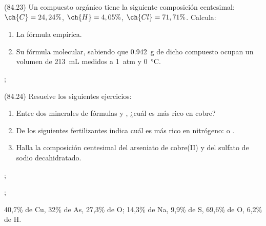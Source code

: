   \begin{exercise}[
      tags    = {},
      topics  = {química,química básica},
      source  = {FQ 1B MGH 2016, p84, e23},
    ]
    (84.23) Un compuesto orgánico tiene la siguiente composición centesimal: \( \ch{C} = 24,24\% \), \( \ch{H} = 4,05\% \), \( \ch{Cl} = 71,71\% \). Calcula: %
    \begin{enumerate}
      \item La fórmula empírica.
      \item Su fórmula molecular, sabiendo que \SI{0.942}{\gram} de dicho compuesto ocupan un volumen de \SI{213}{\milli\liter} medidos a \SI{1}{atm} y \SI{0}{\celsius}.
    \end{enumerate}
  \end{exercise}

  \begin{solution}
    \begin{enumerate*}
      \item {};
      \item {}
    \end{enumerate*}
  \end{solution}




  \begin{exercise}[
      tags    = {},
      topics  = {química,química básica},
      source  = {FQ 1B MGH 2016, p84, e24},
    ]
    (84.24) Resuelve los siguientes ejercicios:
    \begin{enumerate}
      \item Entre dos minerales de fórmulas  y , ¿cuál es más rico en cobre?
      \item De los siguientes fertilizantes indica cuál es más rico en nitrógeno:  o .
      \item Halla la composición centesimal del arseniato de cobre(II)
      y del sulfato de sodio decahidratado.
    \end{enumerate}
  \end{exercise}

  \begin{solution}
    \begin{enumerate*}
      \item {};
      \item {};
      \item 40,7\% de Cu, 32\% de As, 27,3\% de O; 14,3\% de Na, 9,9\% de S, 69,6\% de O, 6,2\% de H.
    \end{enumerate*}
  \end{solution}






